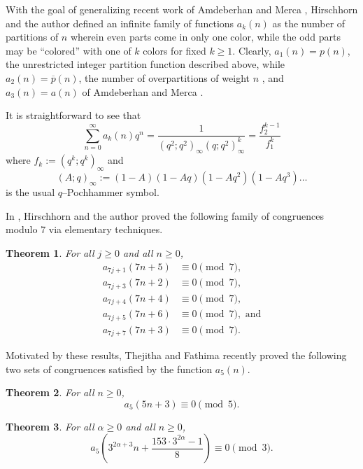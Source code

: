 \documentclass[10pt, reqno]{amsart}
\theoremstyle{theorem}
\newtheorem{theorem}{Theorem}[section]
\theoremstyle{definition}
\theoremstyle{example}
\begin{document}
With the goal of generalizing recent work of Amdeberhan and Merca \cite{AM}, Hirschhorn and the author \cite{HS2025}  defined an infinite family of functions $a_k(n)$ as the number of partitions of $n$ wherein even parts come in only one color, while the odd parts may be ``colored'' with one of $k$ colors for fixed $k\geq 1$.    Clearly, $a_1(n) = p(n)$, the unrestricted integer partition function described above, while $a_2(n) = \overline{p}(n)$, the number of overpartitions of weight $n$ \cite{CL, HS05}, and $a_3(n) = a(n)$ of Amdeberhan and Merca \cite{AM}.  

It is straightforward to see that 
\begin{equation}
\label{genfn_general}
\sum_{n=0}^\infty a_k(n)q^n =\frac{1}{(q^2;q^2)_\infty (q;q^2)_\infty^k} = \frac{f_2^{k-1}}{f_1^k}
\end{equation}
where $f_k:=(q^k;q^k)_\infty$ and 
$$(A;q)_\infty := (1-A)(1-Aq)(1-Aq^2)(1-Aq^3)\dots $$ 
is the usual $q$--Pochhammer symbol.  

In \cite{HS2025}, Hirschhorn and the author proved the following family of congruences modulo 7 via elementary techniques.  

\begin{theorem}
\label{thm:infinite_families_mod7}
For all $j\geq 0$ and all $n\geq 0$, 
\begin{align*}
a_{7j+1}(7n+5) & \equiv 0 \pmod{7},  \\
a_{7j+3}(7n+2) & \equiv 0 \pmod{7}, \\
a_{7j+4}(7n+4) & \equiv 0 \pmod{7},  \\
a_{7j+5}(7n+6) & \equiv 0 \pmod{7}, \text{\ \ and}\\
a_{7j+7}(7n+3) & \equiv 0 \pmod{7}.  
\end{align*}
\end{theorem}

Motivated by these results, Thejitha and Fathima \cite{TF} recently proved the following two sets of congruences satisfied by the function $a_5(n)$.  


\begin{theorem}
\label{thm:TF_mod5} 
For all $n\geq 0$, 
$$a_5(5n+3) \equiv 0 \pmod{5}.$$
\end{theorem}

\begin{theorem}
\label{thm:TF_mod3} 
For all $\alpha \geq 0$ and all $n\geq 0$, 
$$a_{5}\left(3^{2\alpha + 3}n + \frac{153\cdot 3^{2\alpha} - 1}{8}\right)  \equiv 0 \pmod{3}.$$
\end{theorem}
\end{document}

